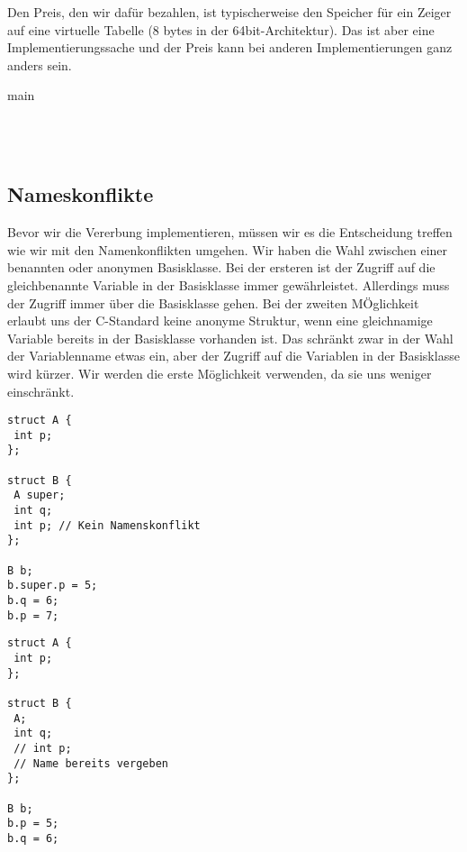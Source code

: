 \documentclass{article}
\newenvironment{code}{\captionsetup{type=listing}}{}
\begin{document}
Den Preis, den wir dafür bezahlen, ist typischerweise den Speicher für ein Zeiger auf eine virtuelle Tabelle (8 bytes in der 64bit-Architektur).
Das ist aber eine Implementierungssache und der Preis kann bei anderen Implementierungen ganz anders sein.


\begin{code}
	\caption{main}
	\inputminted{c}{code/employees_virt/main.c}
	\inputminted{c}{code/employees_virt/output.c}
	\inputminted{cpp}{code/employees_virt_cpp/main.cpp}
	\inputminted{text}{code/employees_virt_cpp/output.txt}
\end{code}


\subsection{Nameskonflikte}

Bevor wir die Vererbung implementieren, müssen wir es die Entscheidung treffen wie wir mit den Namenkonflikten umgehen.
Wir haben die Wahl zwischen einer benannten oder anonymen Basisklasse.
Bei der ersteren ist der Zugriff auf die gleichbenannte Variable in der Basisklasse immer gewährleistet.
Allerdings muss der Zugriff immer über die Basisklasse gehen.
Bei der zweiten MÖglichkeit erlaubt uns der C-Standard keine anonyme Struktur, wenn eine gleichnamige Variable bereits in der Basisklasse vorhanden ist.
Das schränkt zwar in der Wahl der Variablenname etwas ein, aber der Zugriff auf die Variablen in der Basisklasse wird kürzer.
Wir werden die erste Möglichkeit verwenden, da sie uns weniger einschränkt.

\noindent\begin{minipage}{.45\textwidth}
\begin{verbatim}
struct A {
 int p;
};

struct B {
 A super;
 int q;
 int p; // Kein Namenskonflikt
};

B b;
b.super.p = 5;
b.q = 6;
b.p = 7;
\end{verbatim}
\end{minipage}\hfill
\begin{minipage}{.45\textwidth}
\begin{verbatim}
struct A {
 int p;
};

struct B {
 A;
 int q;
 // int p; 
 // Name bereits vergeben
};

B b;
b.p = 5;
b.q = 6;
\end{verbatim}
\end{minipage}
\end{document}
